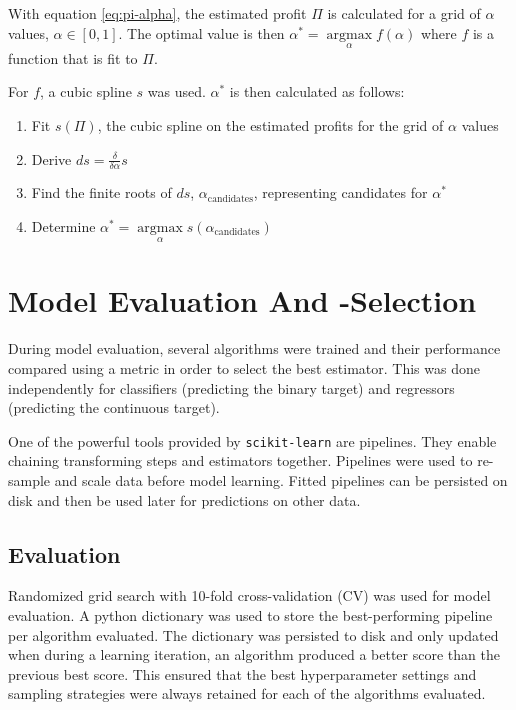 \documentclass[
  11pt,
  a4paper,
  DIV=12,captions=tableheading,oneside,titlepage=firstiscover,abstracton]{scrreprt}
\providecommand{\tightlist}{%
  \setlength{\itemsep}{0pt}\setlength{\parskip}{0pt}}
\providecommand{\tightlist}{%
  \setlength{\itemsep}{0pt}\setlength{\parskip}{0pt}}
\begin{document}
With equation \eqref{eq:pi-alpha}, the estimated profit \(\Pi\) is calculated for a grid of \(\alpha\) values, \(\alpha \in [0,1]\). The optimal value is then \(\alpha^{*} = \underset{\alpha}{\operatorname{argmax}} f(\alpha)\) where \(f\) is a function that is fit to \(\Pi\).

For \(f\), a cubic spline \(s\) was used. \(\alpha^*\) is then calculated as follows:

\begin{enumerate}
\def\labelenumi{\arabic{enumi}.}
\tightlist
\item
  Fit \(s(\Pi)\), the cubic spline on the estimated profits for the grid of \(\alpha\) values
\item
  Derive \(ds = \frac{\delta}{\delta \alpha} s\)
\item
  Find the finite roots of \(ds\), \(\alpha_{\text{candidates}}\), representing candidates for \(\alpha^*\)
\item
  Determine \(\alpha^* = \underset{\alpha}{\operatorname{argmax}} s(\alpha_{\text{candidates}})\)
\end{enumerate}

\hypertarget{eval-and-select}{%
\section{Model Evaluation And -Selection}\label{eval-and-select}}

During model evaluation, several algorithms were trained and their performance compared using a metric in order to select the best estimator. This was done independently for classifiers (predicting the binary target) and regressors (predicting the continuous target).

One of the powerful tools provided by \texttt{scikit-learn} are pipelines. They enable chaining transforming steps and estimators together. Pipelines were used to re-sample and scale data before model learning. Fitted pipelines can be persisted on disk and then be used later for predictions on other data.

\hypertarget{evaluation}{%
\subsection{Evaluation}\label{evaluation}}

Randomized grid search with 10-fold cross-validation (CV) was used for model evaluation. A python dictionary was used to store the best-performing pipeline per algorithm evaluated. The dictionary was persisted to disk and only updated when during a learning iteration, an algorithm produced a better score than the previous best score. This ensured that the best hyperparameter settings and sampling strategies were always retained for each of the algorithms evaluated.
\end{document}
